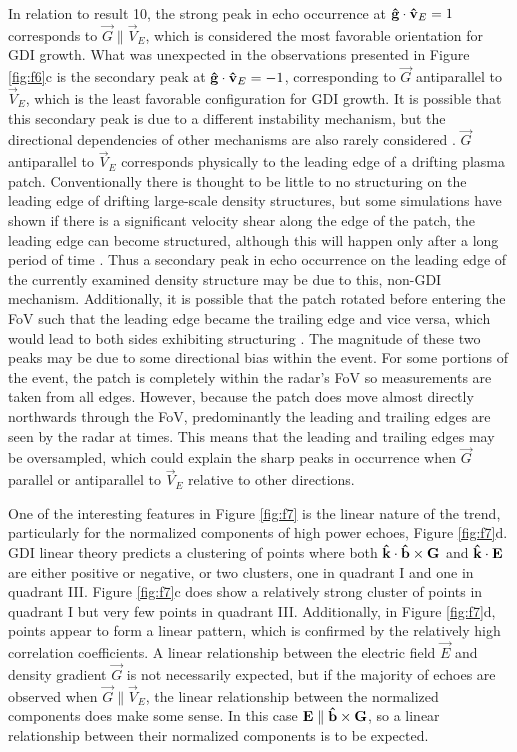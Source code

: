 In relation to result 10, the strong peak in echo occurrence at \(\mathbf{\hat{g}}\cdot\mathbf{\hat{v}}_E = 1\) corresponds to \(\vec{G} \parallel \vec{V}_E\), which is considered the most favorable orientation for GDI growth.  What was unexpected in the observations presented in Figure \ref{fig:f6}c is the secondary peak at \(\mathbf{\hat{g}}\cdot\mathbf{\hat{v}}_E = -1\), corresponding to \(\vec{G}\) antiparallel to \(\vec{V}_E\), which is the least favorable configuration for GDI growth. It is possible that this secondary peak is due to a different instability mechanism, but the directional dependencies of other mechanisms are also rarely considered \citep{Burston2016}.  \(\vec{G}\) antiparallel to \(\vec{V}_E\) corresponds physically to the leading edge of a drifting plasma patch.  Conventionally there is thought to be little to no structuring on the leading edge of drifting large-scale density structures, but some simulations have shown if there is a significant velocity shear along the edge of the patch, the leading edge can become structured, although this will happen  only after a long period of time \citep{Gondarenko2006}. Thus a secondary peak in echo occurrence on the leading edge of the currently examined density structure may be due to this, non-GDI mechanism.  Additionally, it is possible that the patch rotated before entering the FoV such that the leading edge became the trailing edge and vice versa, which would lead to both sides exhibiting structuring \citep{Oksavik2010}.  The magnitude of these two peaks may be due to some directional bias within the event.  For some portions of the event, the patch is completely within the radar's FoV so measurements are taken from all edges.  However, because the patch does move almost directly northwards through the FoV, predominantly the leading and trailing edges are seen by the radar at times.  This means that the leading and trailing edges may be oversampled, which could explain the sharp peaks in occurrence when \(\vec{G}\) parallel or antiparallel to \(\vec{V}_E\) relative to other directions.

One of the interesting features in Figure \ref{fig:f7} is the linear nature of the trend, particularly for the normalized components of high power echoes, Figure \ref{fig:f7}d.  GDI linear theory predicts a clustering of points where both \(\mathbf{\hat{k}}\cdot\mathbf{\hat{b}}\times\mathbf{G}\) and \(\mathbf{\hat{k}}\cdot\mathbf{E}\) are either positive or negative, or two clusters, one in quadrant I and one in quadrant III.  Figure \ref{fig:f7}c does show a relatively strong cluster of points in quadrant I but very few points in quadrant III.  Additionally, in Figure \ref{fig:f7}d, points appear to form a linear pattern, which is confirmed by the relatively high correlation coefficients.  A linear relationship between the electric field \(\vec{E}\) and density gradient \(\vec{G}\) is not necessarily expected, but if the majority of echoes are observed when \(\vec{G}\parallel\vec{V}_E\), the linear relationship between the normalized components does make some sense.  In this case \(\mathbf{E}\parallel\mathbf{\hat{b}}\times\mathbf{G}\), so a linear relationship between their normalized components is to be expected.

